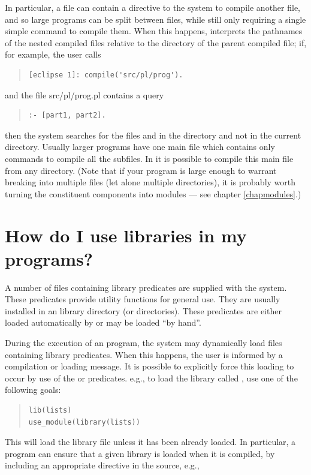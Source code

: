In particular, a file can contain a directive to the system
to compile another file, and so large programs can be split between files,
while still only requiring a single simple command to compile them.
When this happens, {\eclipse} interprets the pathnames of the nested
compiled files relative to the directory of the parent compiled file;
if, for example, the user calls
\begin{quote}
\begin{verbatim}
[eclipse 1]: compile('src/pl/prog').
\end{verbatim}
\end{quote}
and the file src/pl/prog.pl contains a query
\begin{quote}
\begin{verbatim}
:- [part1, part2].
\end{verbatim}
\end{quote}
then the system searches for the files  and
in the
directory  and not in the current directory.
Usually larger {\eclipse} programs have one main file which contains
only commands to compile all the subfiles.
In {\eclipse} it is possible to compile this main file from any directory.
(Note that if your program is large enough to warrant breaking into multiple
files (let alone multiple directories), it is probably worth turning the
constituent components into modules --- see chapter \ref{chapmodules}.)

\section{How do I use {\eclipse} libraries in my programs?}

A number of files containing library predicates are supplied with
the {\eclipse} system.
These predicates provide utility functions for general use.
They are usually installed in an {\eclipse} library directory (or
directories).
These predicates are either loaded automatically by {\eclipse} or may be
loaded ``by hand''.

During the execution of an {\eclipse} program, the system may dynamically
load files containing library predicates. When this happens, the user is
informed by a compilation or loading message.
It is possible to explicitly force this loading to occur by use
of the  or
 predicates.
e.g., to load the library
called , use one of the following goals:
\begin{quote}
\begin{verbatim}
lib(lists)
use_module(library(lists))
\end{verbatim} 
\end{quote}
This will load the library file unless it has been already loaded.
In particular, a program can ensure that a given library is loaded when it
is compiled, by including an appropriate directive in the source, e.g.,

